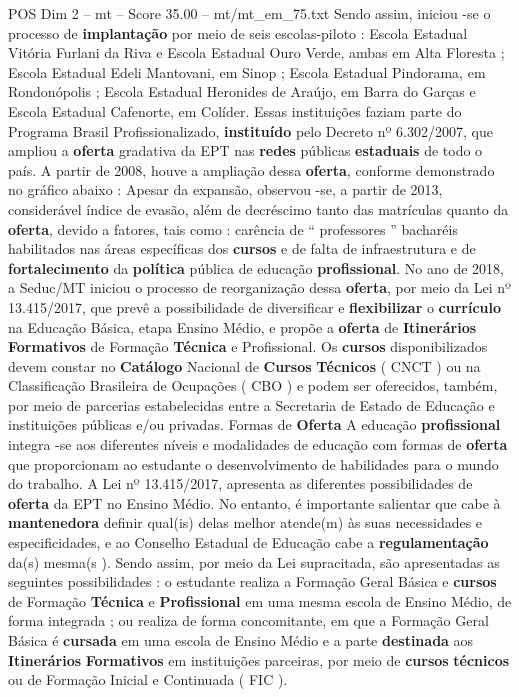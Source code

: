 \begin{textsample}{POS Dim 2 – mt – Score 35.00 – mt/mt\_em\_75.txt}
Sendo assim, iniciou -se o processo de \textbf{implantação} por meio de seis escolas-piloto : Escola Estadual Vitória Furlani da Riva e Escola Estadual Ouro Verde, ambas em Alta Floresta ; Escola Estadual Edeli Mantovani, em Sinop ; Escola Estadual Pindorama, em Rondonópolis ; Escola Estadual Heronides de Araújo, em Barra do Garças e Escola Estadual Cafenorte, em Colíder.
Essas instituições faziam parte do Programa Brasil Profissionalizado, \textbf{instituído} pelo Decreto nº 6.302/2007, que ampliou a \textbf{oferta} gradativa da EPT nas \textbf{redes} públicas \textbf{estaduais} de todo o país.
A partir de 2008, houve a ampliação dessa \textbf{oferta}, conforme demonstrado no gráfico abaixo : Apesar da expansão, observou -se, a partir de 2013, considerável índice de evasão, além de decréscimo tanto das matrículas quanto da \textbf{oferta}, devido a fatores, tais como : carência de “ professores ” bacharéis habilitados nas áreas específicas dos \textbf{cursos} e de falta de infraestrutura e de \textbf{fortalecimento} da \textbf{política} pública de educação \textbf{profissional}.
No ano de 2018, a Seduc/MT iniciou o processo de reorganização dessa \textbf{oferta}, por meio da Lei nº 13.415/2017, que prevê a possibilidade de diversificar e \textbf{flexibilizar} o \textbf{currículo} na Educação Básica, etapa Ensino Médio, e propõe a \textbf{oferta} de \textbf{Itinerários} \textbf{Formativos} de Formação \textbf{Técnica} e Profissional.
Os \textbf{cursos} disponibilizados devem constar no \textbf{Catálogo} Nacional de \textbf{Cursos} \textbf{Técnicos} ( CNCT ) ou na Classificação Brasileira de Ocupações ( CBO ) e podem ser oferecidos, também, por meio de parcerias estabelecidas entre a Secretaria de Estado de Educação e instituições públicas e/ou privadas.
Formas de \textbf{Oferta} A educação \textbf{profissional} integra -se aos diferentes níveis e modalidades de educação com formas de \textbf{oferta} que proporcionam ao estudante o desenvolvimento de habilidades para o mundo do trabalho.
A Lei nº 13.415/2017, apresenta as diferentes possibilidades de \textbf{oferta} da EPT no Ensino Médio.
No entanto, é importante salientar que cabe à \textbf{mantenedora} definir qual(is) delas melhor atende(m) às suas necessidades e especificidades, e ao Conselho Estadual de Educação cabe a \textbf{regulamentação} da(s) mesma(s ).
Sendo assim, por meio da Lei supracitada, são apresentadas as seguintes possibilidades : o estudante realiza a Formação Geral Básica e \textbf{cursos} de Formação \textbf{Técnica} e \textbf{Profissional} em uma mesma escola de Ensino Médio, de forma integrada ; ou realiza de forma concomitante, em que a Formação Geral Básica é \textbf{cursada} em uma escola de Ensino Médio e a parte \textbf{destinada} aos \textbf{Itinerários} \textbf{Formativos} em instituições parceiras, por meio de \textbf{cursos} \textbf{técnicos} ou de Formação Inicial e Continuada ( FIC ).

\end{textsample}
